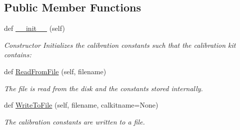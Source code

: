 \subsection*{Public Member Functions}
\begin{DoxyCompactItemize}
\item 
def \hyperlink{classSignalIntegrity_1_1Measurement_1_1CalKit_1_1CalibrationKit_1_1CalibrationConstants_ae64f0875afe3067b97ba370b354b9213}{\+\_\+\+\_\+init\+\_\+\+\_\+} (self)
\begin{DoxyCompactList}\small\item\em Constructor Initializes the calibration constants such that the calibration kit contains\+: \end{DoxyCompactList}\item 
def \hyperlink{classSignalIntegrity_1_1Measurement_1_1CalKit_1_1CalibrationKit_1_1CalibrationConstants_a3dc78f8134b7196685f6b0b5ace5e33b}{Read\+From\+File} (self, filename)
\begin{DoxyCompactList}\small\item\em The file is read from the disk and the constants stored internally. \end{DoxyCompactList}\item 
def \hyperlink{classSignalIntegrity_1_1Measurement_1_1CalKit_1_1CalibrationKit_1_1CalibrationConstants_ac68713cc133371d7a733dd318b5669d3}{Write\+To\+File} (self, filename, calkitname=None)
\begin{DoxyCompactList}\small\item\em The calibration constants are written to a file. \end{DoxyCompactList}\end{DoxyCompactItemize}
